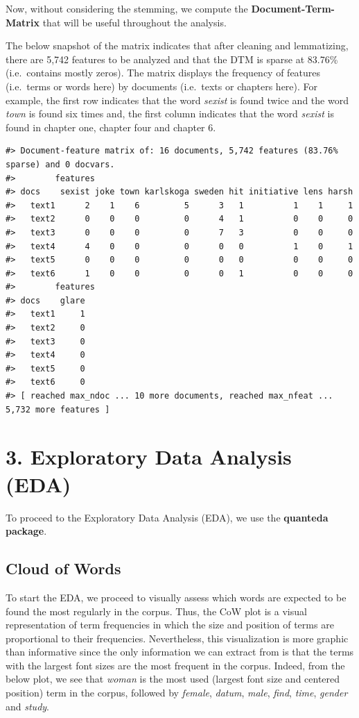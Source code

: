 \documentclass[
]{article}
\begin{document}
Now, without considering the stemming, we compute the
\textbf{Document-Term-Matrix} that will be useful throughout the
analysis.

The below snapshot of the matrix indicates that after cleaning and
lemmatizing, there are 5,742 features to be analyzed and that the DTM is
sparse at 83.76\% (i.e.~contains mostly zeros). The matrix displays the
frequency of features (i.e.~terms or words here) by documents
(i.e.~texts or chapters here). For example, the first row indicates that
the word \emph{sexist} is found twice and the word \emph{town} is found
six times and, the first column indicates that the word \emph{sexist} is
found in chapter one, chapter four and chapter 6.

\begin{verbatim}
#> Document-feature matrix of: 16 documents, 5,742 features (83.76% sparse) and 0 docvars.
#>        features
#> docs    sexist joke town karlskoga sweden hit initiative lens harsh
#>   text1      2    1    6         5      3   1          1    1     1
#>   text2      0    0    0         0      4   1          0    0     0
#>   text3      0    0    0         0      7   3          0    0     0
#>   text4      4    0    0         0      0   0          1    0     1
#>   text5      0    0    0         0      0   0          0    0     0
#>   text6      1    0    0         0      0   1          0    0     0
#>        features
#> docs    glare
#>   text1     1
#>   text2     0
#>   text3     0
#>   text4     0
#>   text5     0
#>   text6     0
#> [ reached max_ndoc ... 10 more documents, reached max_nfeat ... 5,732 more features ]
\end{verbatim}

\hypertarget{exploratory-data-analysis-eda}{%
\section{3. Exploratory Data Analysis
(EDA)}\label{exploratory-data-analysis-eda}}

To proceed to the Exploratory Data Analysis (EDA), we use the
\textbf{quanteda package}.

\hypertarget{cloud-of-words}{%
\subsection{Cloud of Words}\label{cloud-of-words}}

To start the EDA, we proceed to visually assess which words are expected
to be found the most regularly in the corpus. Thus, the CoW plot is a
visual representation of term frequencies in which the size and position
of terms are proportional to their frequencies. Nevertheless, this
visualization is more graphic than informative since the only
information we can extract from is that the terms with the largest font
sizes are the most frequent in the corpus. Indeed, from the below plot,
we see that \emph{woman} is the most used (largest font size and
centered position) term in the corpus, followed by \emph{female},
\emph{datum}, \emph{male}, \emph{find}, \emph{time}, \emph{gender} and
\emph{study}.
\end{document}
